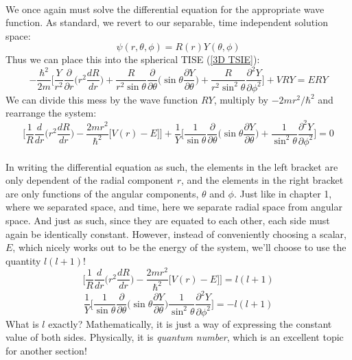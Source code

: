 \documentclass[12pt,letterpaper]{book}
\begin{document}
\paragraph*{}We once again must solve the differential equation for the appropriate wave function. As standard, we revert to our separable, time independent solution space:
\begin{equation}
\psi(r,\theta,\phi ) = R(r)Y(\theta,\phi )
\end{equation}
Thus we can place this into the spherical TISE (\ref{3D TSIE}):
\begin{equation}
-\frac{\hbar^2}{2m} \Bigg[ \frac{Y}{r^2} \frac{\partial}{\partial r} \Big(r^2\frac{dR}{dr}\Big) + 
\frac{R}{r^2 \sin\theta} \frac{\partial}{\partial \theta} \Big( \sin\theta \frac{\partial Y}{\partial \theta} \Big) +
\frac{R}{r^2 \sin^2\theta} \frac{\partial^2 Y}{\partial \phi^2} \Bigg] +
VRY = ERY
\end{equation}
We can divide this mess by the wave function $RY$, multiply by $-2mr^2/\hbar^2$ and rearrange the system:
\begin{equation}
\Bigg[ \frac{1}{R}\frac{d}{dr} \Big(r^2 \frac{dR}{dr}\Big) - \frac{2mr^2}{\hbar^2}\big[ V(r) - E \big] \Bigg] +
\frac{1}{Y} \Bigg[ \frac{1}{\sin\theta}\frac{\partial}{\partial\theta}\Big(\sin\theta\frac{\partial Y}{\partial \theta}\Big) +
\frac{1}{\sin^2 \theta} \frac{\partial^2 Y}{\partial \phi^2} \Bigg] = 0
\end{equation}

\paragraph*{}In writing the differential equation as such, the elements in the left bracket are only dependent of the radial component $r$, and the elements in the right bracket are only functions of the angular components, $\theta$ and $\phi$. Just like in chapter 1, where we separated space, and time, here we separate radial space from angular space. And just as such, since they are equated to each other, each side must again be identically constant. However, instead of conveniently choosing a scalar, $E$, which nicely works out to be the energy of the system, we'll choose to use the quantity $l(l+1)$!
\begin{equation}
\Bigg[ \frac{1}{R}\frac{d}{dr} \Big(r^2 \frac{dR}{dr}\Big) - \frac{2mr^2}{\hbar^2}\big[ V(r) - E \big] \Bigg] = l(l+1)
\end{equation}
\begin{equation}
\frac{1}{Y} \Bigg[ \frac{1}{\sin\theta}\frac{\partial}{\partial\theta}\Big(\sin\theta\frac{\partial Y}{\partial \theta}\Big) 
\frac{1}{\sin^2 \theta} \frac{\partial^2 Y}{\partial \phi^2} \Bigg] = -l(l+1)
\end{equation}
What is $l$ exactly? Mathematically, it is just a way of expressing the constant value of both sides. Physically, it is \textit{quantum number}, which is an excellent topic for another section!
\end{document}
